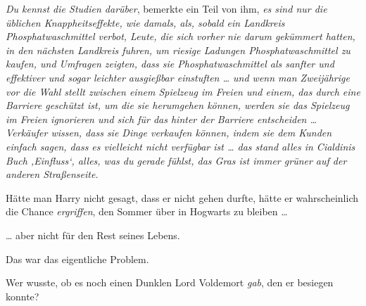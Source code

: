 \emph{Du kennst die \emph{Studien} darüber}, bemerkte ein Teil von ihm, \emph{es sind nur die üblichen Knappheitseffekte, wie damals, als, sobald ein Landkreis Phosphatwaschmittel verbot, Leute, die sich vorher nie darum gekümmert hatten, in den nächsten Landkreis fuhren, um riesige Ladungen Phosphatwaschmittel zu kaufen, und Umfragen zeigten, dass sie Phosphatwaschmittel als sanfter und effektiver und sogar leichter ausgießbar einstuften … und wenn man Zweijährige vor die Wahl stellt zwischen einem Spielzeug im Freien und einem, das durch eine Barriere geschützt ist, um die sie herumgehen können, werden sie das Spielzeug im Freien ignorieren und sich für das hinter der Barriere entscheiden … Verkäufer wissen, dass sie Dinge verkaufen können, indem sie dem Kunden einfach sagen, dass es vielleicht nicht verfügbar ist … das stand alles in Cialdinis Buch ‚Einfluss‘, alles, was du gerade fühlst, das Gras ist immer grüner auf der anderen Straßenseite.}

Hätte man Harry nicht gesagt, dass er nicht gehen durfte, hätte er wahrscheinlich die Chance \emph{ergriffen}, den Sommer über in Hogwarts zu bleiben …

… aber nicht für den Rest seines Lebens.

Das war das eigentliche Problem.

Wer wusste, ob es noch einen Dunklen Lord Voldemort \emph{gab}, den er besiegen konnte?

